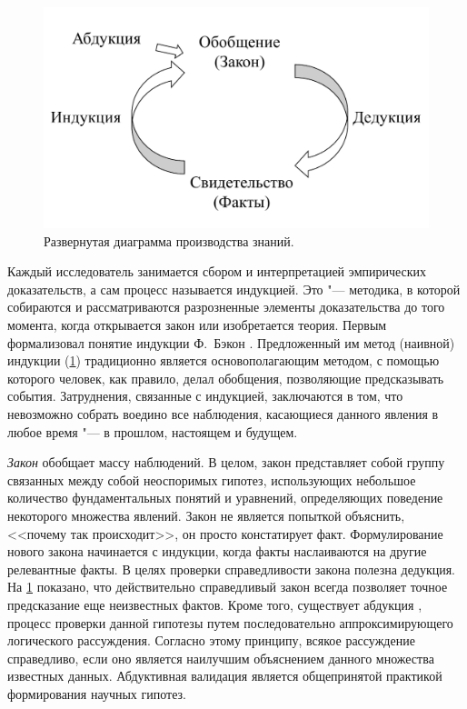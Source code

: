 \begin{figure}[ht]
    \centering
    \includegraphics[width=0.7\linewidth]{images/science_lifecycle}
    \caption{Развернутая диаграмма производства знаний.}\label{fig:knowledge_production}
\end{figure}

Каждый исследователь занимается сбором и интерпретацией эмпирических доказательств, а сам процесс называется индукцией. 
Это "--- методика, в которой собираются и рассматриваются разрозненные элементы доказательства до того момента, когда 
открывается закон или изобретается теория. Первым формализовал понятие индукции Ф.~Бэкон \cite{Bacon2000}. 
Предложенный им метод (наивной) индукции (\cref{fig:knowledge_production}) традиционно является основополагающим 
методом, с помощью которого человек, как правило, делал обобщения, позволяющие предсказывать события. Затруднения, 
связанные с индукцией, заключаются в том, что невозможно собрать воедино все наблюдения, касающиеся данного явления 
в любое время "--- в прошлом, настоящем и будущем.  

\textit{Закон} обобщает массу наблюдений. В целом, закон представляет собой группу связанных между собой неоспоримых 
гипотез, использующих небольшое количество фундаментальных понятий и уравнений, определяющих поведение некоторого 
множества явлений. Закон не является попыткой объяснить, <<почему так происходит>>, он просто констатирует факт. 
Формулирование нового закона начинается с индукции, когда факты наслаиваются на другие релевантные факты. В целях 
проверки справедливости закона полезна дедукция.  На \cref{fig:knowledge_production} показано, что действительно 
справедливый закон всегда позволяет точное предсказание еще неизвестных фактов.  Кроме того, существует абдукция 
\cite{Menzies1996}, процесс проверки данной гипотезы путем последовательно аппроксимирующего логического рассуждения. 
Согласно этому принципу, всякое рассуждение справедливо, если оно является наилучшим объяснением данного множества 
известных данных. Абдуктивная валидация является общепринятой практикой формирования научных гипотез.

